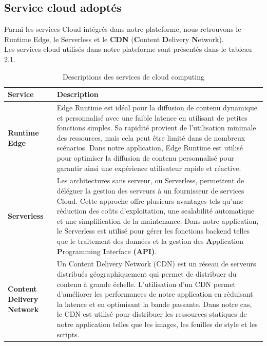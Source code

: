 \subsection{Service cloud adoptés}
\justifying
Parmi les services Cloud intégrés dans notre plateforme, nous retrouvons le Runtime Edge, le Serverless et le \textbf{CDN} (\textbf{C}ontent \textbf{D}elivery \textbf{N}etwork).\\
Les services cloud utilisés dans notre plateforme sont présentés dans le tableau 2.1.


\begin{longtable}{|>{\RaggedRight\arraybackslash}p{}|>{\RaggedRight\arraybackslash}p{}|}
    \caption{Descriptions des services de cloud computing}
    \label{table:cloud_services} \\
    \hline
    \rowcolor{gray!25}
    \textbf{Service} & \textbf{Description} \\
    \hline
    \cellcolor{gray!25}\textbf{Runtime Edge} & Edge Runtime est idéal pour la diffusion de contenu dynamique et personnalisé avec une faible latence en utilisant de petites fonctions simples. Sa rapidité provient de l'utilisation minimale des ressources, mais cela peut être limité dans de nombreux scénarios. Dans notre application, Edge Runtime est utilisé pour optimiser la diffusion de contenu personnalisé pour garantir ainsi une expérience utilisateur rapide et réactive. \\
    \hline
    \cellcolor{gray!25}\textbf{Serverless} & Les architectures sans serveur, ou Serverless, permettent de déléguer la gestion des serveurs à un fournisseur de services Cloud. Cette approche offre plusieurs avantages tels qu'une réduction des coûts d'exploitation, une scalabilité automatique et une simplification de la maintenance. Dans notre application, le Serverless est utilisé pour gérer les fonctions backend telles que le traitement des données et la gestion des \textbf{A}pplication \textbf{P}rogramming \textbf{I}nterface \textbf{(API)}. \\
    \hline
    \cellcolor{gray!25}\textbf{Content Delivery Network} & Un Content Delivery Network (CDN) est un réseau de serveurs distribués géographiquement qui permet de distribuer du contenu à grande échelle. L'utilisation d'un CDN permet d'améliorer les performances de notre application en réduisant la latence et en optimisant la bande passante. Dans notre cas, le CDN est utilisé pour distribuer les ressources statiques de notre application telles que les images, les feuilles de style et les scripts. \\
    \hline
\end{longtable}

